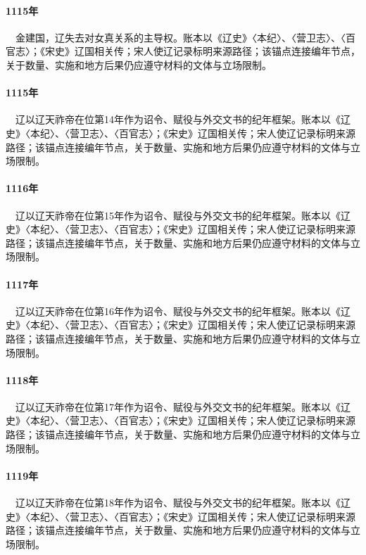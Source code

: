 \paragraph{1115年}　金建国，辽失去对女真关系的主导权。账本以《辽史》〈本纪〉、〈营卫志〉、〈百官志〉；《宋史》辽国相关传；宋人使辽记录标明来源路径；该锚点连接编年节点，关于数量、实施和地方后果仍应遵守材料的文体与立场限制。

\paragraph{1115年}　辽以辽天祚帝在位第14年作为诏令、赋役与外交文书的纪年框架。账本以《辽史》〈本纪〉、〈营卫志〉、〈百官志〉；《宋史》辽国相关传；宋人使辽记录标明来源路径；该锚点连接编年节点，关于数量、实施和地方后果仍应遵守材料的文体与立场限制。

\paragraph{1116年}　辽以辽天祚帝在位第15年作为诏令、赋役与外交文书的纪年框架。账本以《辽史》〈本纪〉、〈营卫志〉、〈百官志〉；《宋史》辽国相关传；宋人使辽记录标明来源路径；该锚点连接编年节点，关于数量、实施和地方后果仍应遵守材料的文体与立场限制。

\paragraph{1117年}　辽以辽天祚帝在位第16年作为诏令、赋役与外交文书的纪年框架。账本以《辽史》〈本纪〉、〈营卫志〉、〈百官志〉；《宋史》辽国相关传；宋人使辽记录标明来源路径；该锚点连接编年节点，关于数量、实施和地方后果仍应遵守材料的文体与立场限制。

\paragraph{1118年}　辽以辽天祚帝在位第17年作为诏令、赋役与外交文书的纪年框架。账本以《辽史》〈本纪〉、〈营卫志〉、〈百官志〉；《宋史》辽国相关传；宋人使辽记录标明来源路径；该锚点连接编年节点，关于数量、实施和地方后果仍应遵守材料的文体与立场限制。

\paragraph{1119年}　辽以辽天祚帝在位第18年作为诏令、赋役与外交文书的纪年框架。账本以《辽史》〈本纪〉、〈营卫志〉、〈百官志〉；《宋史》辽国相关传；宋人使辽记录标明来源路径；该锚点连接编年节点，关于数量、实施和地方后果仍应遵守材料的文体与立场限制。

